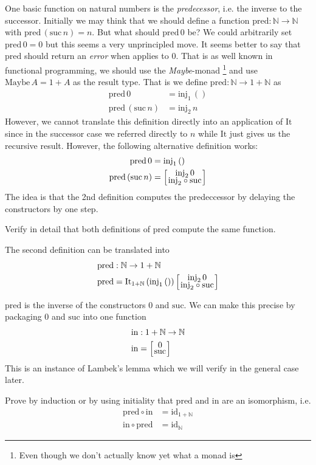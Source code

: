 \documentclass{article}
\newcommand{\id}{\mathrm{id}}
\newcommand{\Nat}{\mathbb{N}}
\newcommand{\suc}{\mathrm{suc}}
\newcommand{\Maybe}{\mathrm{Maybe}}
\newcommand{\inj}{\mathrm{inj}}
\newcommand{\case}[2]{{\setlength{\arraycolsep}{1pt}
   \renewcommand{\arraystretch}{0.6}\left[\begin{array}{c}#1\\#2\end{array}\right]}}
\newcommand{\It}{\mathrm{It}}
\newcommand{\pred}{\mathrm{pred}}
\newcommand{\inn}{\mathrm{in}}
\begin{document}
One basic function on natural numbers is the \emph{predecessor}, i.e. the inverse to the successor. Initially we may think that we should define a function $\pred : \Nat \to \Nat$ with $\pred\,(\suc\,n) = n$. But what should $\pred\,0$ be? We could arbitrarily set $\pred\,0 = 0$ but this seems a very unprincipled move. It seems better to say that $\pred$ should return an \emph{error} when applies to $0$. That is as well known in functional programming, we should use the \emph{Maybe}-monad
\footnote{Even though we don't actually know yet what a monad is}
and use $\Maybe\,A = 1 + A$ as the result type. That is we define $\pred : \Nat \to 1 + \Nat$ as
\begin{align*}
\pred\,0 & = \inj_1\,() \\
\pred\,(\suc\,n) & = \inj_2\,n
\end{align*}
However, we cannot translate this definition directly into an application of $\It$ since in the successor case we referred directly to $n$ while $\It$ just gives us the recursive result. However, the following alternative definition works:
\begin{align*}
\pred\,0 & = \inj_1\,() \\
\pred\,(\suc\,n) & = \case{\inj_2\,0}{\inj_2 \circ \suc}
\end{align*}
The idea is that the 2nd definition computes the predeccessor by delaying the constructors by one step.
\begin{Exercise}
Verify in detail that both definitions of $\pred$ compute the same function.                     
\end{Exercise}
The second definition can be translated into 
\begin{align*}
& \pred : \Nat \to 1+\Nat \\
& \pred = \It_{1+\Nat}\,(\inj_1\,())\, \case{\inj_2\,0}{\inj_2 \circ \suc}
\end{align*}

$\pred$ is the inverse of the constructors $0$ and $\suc$. We can make this precise by packaging $0$ and $\suc$ into one function 
\begin{align*}
& \inn : 1+\Nat \to \Nat \\
& \inn = \case{0}{\suc} 
\end{align*}
This is an instance of Lambek's lemma which we will verify in the general case later. 
\begin{Exercise}
  Prove by induction or by using initiality that $\pred$ and $\inn$ are an isomorphism, i.e.
  \begin{align*}
    \pred \circ \inn & = \id_{1+\Nat} \\
    \inn \circ \pred & = \id_\Nat
  \end{align*}
\end{Exercise}
\end{document}

